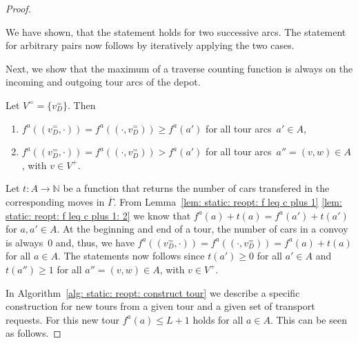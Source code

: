 \documentclass[english]{llncs}
\numberwithin{sublemma}{lemma}
\newcommand{\NN}{\ensuremath{\mathbb{N}}}
\newcommand{\capd}{\ensuremath{L}}
\newcommand{\tourd}{\ensuremath{\Gamma}}
\newcommand{\Vpick}{{V^+}}
\newcommand{\Vbal}{{V^=}}
\begin{document}
\begin{proof}
\begin{subproof}
We have shown, that the statement holds for two successive arcs.
The statement for arbitrary pairs now follows by iteratively applying the two cases.
\end{subproof}



Next, we show that the maximum of a traverse counting function is always on the incoming and outgoing tour arcs of the depot.



\begin{sublemma}
\label{cor: static: reopt: f geq f and f gt f}
  Let $\Vbal = \{ v_D^= \}$.
  Then 
  \begin{enumerate}
  \item $f^a((v_D^=, \cdot)) = f^a((\cdot, v_D^=)) \geq f^a(a')$ for all tour arcs~$a' \in A$,
  \item $f^a((v_D^=, \cdot)) = f^a((\cdot, v_D^=)) > f^a(a')$ for all tour arcs~$a'' = (v, w) \in A$, with $v \in \Vpick$.
  \end{enumerate}
\end{sublemma}



\begin{subproof}
Let $t : A \to \NN$ be a function that returns the number of cars transfered in the corresponding moves in $\overline{\tourd}$.
From Lemma~\ref{lem: static: reopt: f leq c plus 1} \ref{lem: static: reopt: f leq c plus 1: 2} we know that $f^a(a) + t(a) = f^a(a') + t(a')$ for $a, a' \in A$.
At the beginning and end of a tour, the number of cars in a convoy is always~$0$ and, thus, we have $f^a((v_D^=, \cdot)) = f^a((\cdot, v_D^=)) = f^a(a) + t(a)$ for all $a \in A$.
The statements now follows since $t(a') \geq 0$ for all $a' \in A$ and $t(a'') \geq 1$ for all $a'' = (v, w) \in A$, with $v \in \Vpick$.
\end{subproof}



In Algorithm~\ref{alg: static: reopt: construct tour} we describe a specific construction for new tours from a given tour and a given set of transport requests.
For this new tour $f^a(a) \leq \capd + 1$ holds for all $a \in A$.
This can be seen as follows.




\end{proof}
\end{document}

